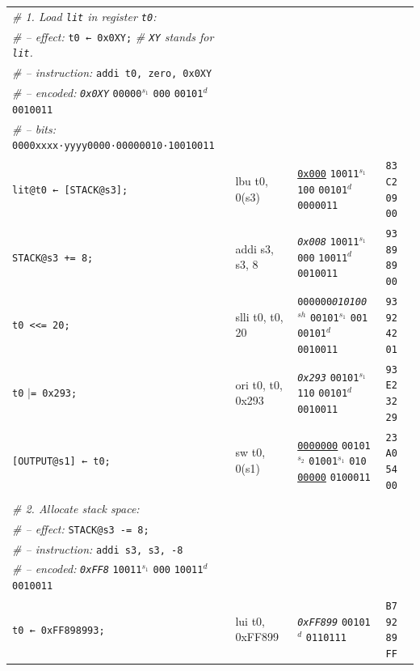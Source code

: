 \documentclass[a4paper,12pt,final]{article}
\begin{document}
\begin{table}[!htbp]
\begin{adjustwidth}{-1cm}{-1cm}
\begin{center}
\begin{tabular}{l|ll|l}
\emph{\# 1. Load \texttt{lit} in register \texttt{t0}:} &  &  & \\[0pt]
\emph{\# – effect:} \texttt{t0 ← 0x0XY;}  \emph{\# \texttt{XY} stands for \texttt{lit}.} &  &  & \\[0pt]
\emph{\# – instruction:} \texttt{addi t0, zero, 0x0XY} &  &  & \\[0pt]
\emph{\# – encoded:} \emph{\texttt{0x0XY}} \texttt{00000}​\(^{s_{1}}\) \texttt{000} \texttt{00101}​\(^{d}\) \texttt{0010011} &  &  & \\[0pt]
\emph{\# – bits:} \texttt{0000xxxx·yyyy0000·00000010·10010011} &  &  & \\[0pt]
\texttt{lit@t0 ← [STACK@s3];} & lbu t0, 0(s3) & \uline{\texttt{0x000}}                    \texttt{10011}​\(^{s_{1}}\) \texttt{100} \texttt{00101}​\(^{d}\)  \texttt{0000011} & \texttt{83 C2 09 00}\\[0pt]
\texttt{STACK@s3 += 8;} & addi s3, s3, 8 & \emph{\texttt{0x008}}                    \texttt{10011}​\(^{s_{1}}\) \texttt{000} \texttt{10011}​\(^{d}\)  \texttt{0010011} & \texttt{93 89 89 00}\\[0pt]
\texttt{t0 <{}<{}= 20;} & slli t0, t0, 20 & \texttt{000000}​\emph{\texttt{010100}}​\(^{sh}\)         \texttt{00101}​\(^{s_{1}}\) \texttt{001} \texttt{00101}​\(^{d}\)  \texttt{0010011} & \texttt{93 92 42 01}\\[0pt]
\texttt{t0} \(\vert{}\)​\texttt{= 0x293;} & ori t0, t0, 0x293 & \emph{\texttt{0x293}}                    \texttt{00101}​\(^{s_{1}}\) \texttt{110} \texttt{00101}​\(^{d}\)  \texttt{0010011} & \texttt{93 E2 32 29}\\[0pt]
\texttt{[OUTPUT@s1] ← t0;} & sw t0, 0(s1) & \uline{\texttt{0000000}} \texttt{00101}​\(^{s_{2}}\) \texttt{01001}​\(^{s_{1}}\) \texttt{010} \uline{\texttt{00000}} \texttt{0100011} & \texttt{23 A0 54 00}\\[0pt]
 &  &  & \\[0pt]
\emph{\# 2. Allocate stack space:} &  &  & \\[0pt]
\emph{\# – effect:} \texttt{STACK@s3 -= 8;} &  &  & \\[0pt]
\emph{\# – instruction:} \texttt{addi s3, s3, -8} &  &  & \\[0pt]
\emph{\# – encoded:} \emph{\texttt{0xFF8}} \texttt{10011}​\(^{s_{1}}\) \texttt{000} \texttt{10011}​\(^{d}\) \texttt{0010011} &  &  & \\[0pt]
\texttt{t0 ← 0xFF898993;} & lui t0, 0xFF899 & \emph{\texttt{0xFF899}}                                                  \texttt{00101}​\(^{d}\)  \texttt{0110111} & \texttt{B7 92 89 FF}\\[0pt]

\end{tabular}
\end{center}
\end{adjustwidth}
\end{table}
\end{document}
